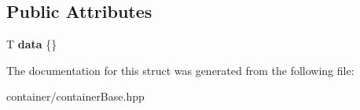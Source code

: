 \subsection*{Public Attributes}
\begin{DoxyCompactItemize}
\item 
\mbox{\label{structContainerBase_ad27f75d60f395b9405c21531f903e1dc}} 
T {\bfseries data} \{\}
\end{DoxyCompactItemize}


The documentation for this struct was generated from the following file\+:\begin{DoxyCompactItemize}
\item 
container/container\+Base.\+hpp\end{DoxyCompactItemize}
